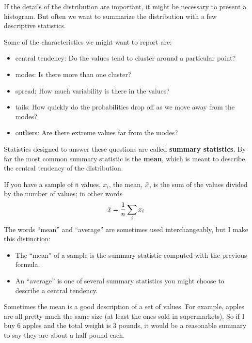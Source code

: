 \documentclass[12pt]{book}
\begin{document}
If the details of the distribution are important, it might be
necessary to present a histogram.  But often we want to
summarize the distribution with a few descriptive statistics.

Some of the characteristics we might want to report are:

\begin{itemize}

\item central tendency: Do the values tend to cluster around
a particular point?

\item modes: Is there more than one cluster?

\item spread: How much variability is there in the values?

\item tails: How quickly do the probabilities drop off as we
move away from the modes?

\item outliers: Are there extreme values far from the modes?

\end{itemize}

Statistics designed to answer these questions are called {\bf summary
  statistics}.  By far the most common summary statistic is the {\bf
  mean}, which is meant to describe the central tendency of the
distribution.    

If you have a sample of {\tt n} values, $x_i$, the mean, $\bar{x}$, is
the sum of the values divided by the number of values; in other words
%
\[ \bar{x} = \frac{1}{n} \sum_i x_i \]
%
The words ``mean'' and ``average'' are sometimes used interchangeably,
but I make this distinction:

\begin{itemize}

\item The ``mean'' of a sample is the summary statistic computed with
  the previous formula.

\item An ``average'' is one of several summary statistics you might
  choose to describe a central tendency.

\end{itemize}

Sometimes the mean is a good description of a set of values.  For
example, apples are all pretty much the same size (at least the ones
sold in supermarkets).  So if I buy 6 apples and the total weight is 3
pounds, it would be a reasonable summary to say they are about a half
pound each.
\end{document}

